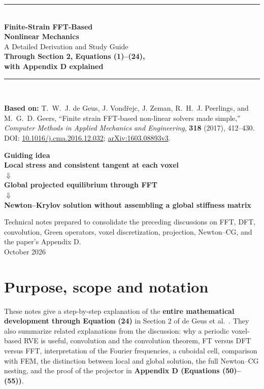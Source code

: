 \documentclass[11pt,a4paper]{article}
\numberwithin{equation}{section}
\begin{document}
\begin{titlepage}
\centering
\vspace*{1.4cm}
{\color{navy}\rule{\textwidth}{1.3pt}}\\[0.8cm]
{\Huge\bfseries Finite-Strain FFT-Based\\[0.17cm] Nonlinear Mechanics}\\[0.4cm]
{\LARGE A Detailed Derivation and Study Guide}\\[0.6cm]
{\large\bfseries Through Section 2, Equations (1)--(24),\\ with Appendix D explained}\\[1.0cm]
{\color{navy}\rule{\textwidth}{0.7pt}}\\[1.1cm]
\begin{minipage}{0.89\textwidth}
\large
\textbf{Based on:} T.~W.~J. de Geus, J. Vond\v{r}ejc, J. Zeman, R.~H.~J. Peerlings, and M.~G.~D. Geers, ``Finite strain FFT-based non-linear solvers made simple,'' \emph{Computer Methods in Applied Mechanics and Engineering}, \textbf{318} (2017), 412--430. DOI: \href{https://doi.org/10.1016/j.cma.2016.12.032}{10.1016/j.cma.2016.12.032}; \href{https://arxiv.org/abs/1603.08893}{arXiv:1603.08893v3}.
\end{minipage}
\vfill
\begin{tcolorbox}[colback=lightblue,colframe=blue!35!white,boxrule=.5pt,width=.93\textwidth]
\centering\large\bfseries Guiding idea\\[5pt]
\normalsize Local stress and consistent tangent at each voxel\\
$\Downarrow$\\
Global projected equilibrium through FFT\\
$\Downarrow$\\
Newton--Krylov solution without assembling a global stiffness matrix
\end{tcolorbox}
\vspace{1cm}
{\normalsize Technical notes prepared to consolidate the preceding discussions on FFT, DFT, convolution, Green operators, voxel discretization, projection, Newton--CG, and the paper's Appendix D.}\\[.5cm]
{\normalsize October 2026}
\end{titlepage}
\setcounter{page}{2}
\tableofcontents
\clearpage
{}

\section{Purpose, scope and notation}
These notes give a step-by-step explanation of the \textbf{entire mathematical development through Equation (24)} in Section 2 of de Geus et al.\ \cite{degeus2017}. They also summarize related explanations from the discussion: why a periodic voxel-based RVE is useful, convolution and the convolution theorem, FT versus DFT versus FFT, interpretation of the Fourier frequencies, a cuboidal cell, comparison with FEM, the distinction between local and global solution, the full Newton--CG nesting, and the proof of the projector in \textbf{Appendix D (Equations (50)--(55))}.
\end{document}
